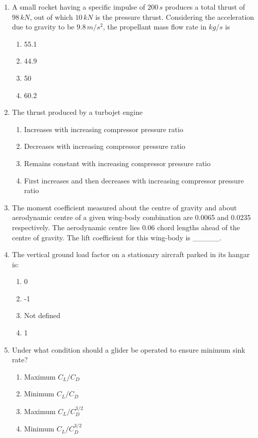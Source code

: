 \documentclass[journal]{IEEEtran}
\begin{document}
\begin{enumerate}
\item  
A small rocket having a specific impulse of $200\,s$ produces a total thrust of $98\,kN$, out of which $10\,kN$ is the pressure thrust. Considering the acceleration due to gravity to be $9.8\,m/s^2$, the propellant mass flow rate in $kg/s$ is  
\begin{enumerate}
    \item 55.1
    \item 44.9
    \item 50
    \item 60.2
\end{enumerate}
\hfill{}

\item  
The thrust produced by a turbojet engine  
\begin{enumerate}
    \item Increases with increasing compressor pressure ratio
    \item Decreases with increasing compressor pressure ratio
    \item Remains constant with increasing compressor pressure ratio
    \item First increases and then decreases with increasing compressor pressure ratio
\end{enumerate}
\hfill{}

\item  
The moment coefficient measured about the centre of gravity and about aerodynamic centre of a given wing-body combination are 0.0065 and 0.0235 respectively. The aerodynamic centre lies 0.06 chord lengths ahead of the centre of gravity. The lift coefficient for this wing-body is \_\_\_\_\_.

\hfill{}

\item  
The vertical ground load factor on a stationary aircraft parked in its hangar is:  
\begin{enumerate}
    \item 0
    \item -1
    \item Not defined
    \item 1
\end{enumerate}
\hfill{}

\item 
Under what condition should a glider be operated to ensure minimum sink rate?  
\begin{enumerate}
    \item Maximum $C_L/C_D$
    \item Minimum $C_L/C_D$
    \item Maximum $C_L/C_D^{3/2}$
    \item Minimum $C_L/C_D^{3/2}$
\end{enumerate}


\end{enumerate}
\end{document}

